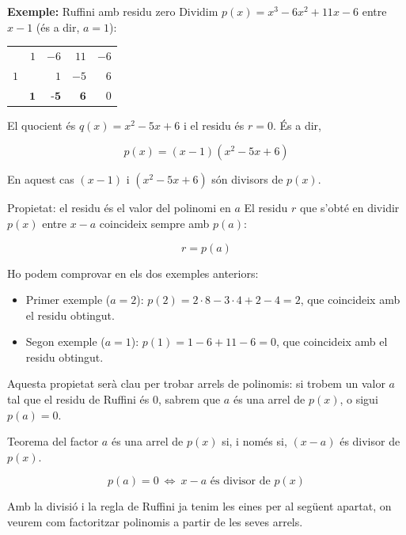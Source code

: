 \begin{exemple}{\textbf{Exemple:} Ruffini amb residu zero}
Dividim $p(x) = x^3-6x^2+11x-6$ entre $x-1$ (és a dir, $a=1$):

\begin{center}
\renewcommand{\arraystretch}{1.25}
\begin{tabular}{r|rrrr}
 & $1$ & $-6$ & $11$ & $-6$ \\
$1$ &  & $1$ & $-5$ & $6$ \\ \hline
 & $\textbf{1}$ & $\textbf{-5}$ & $\textbf{6}$ & $\boxed{0}$ \\
\end{tabular}
\end{center}

El quocient és $q(x)=x^2-5x+6$ i el residu és $r=0$. És a dir,

\[
p(x) = (x-1)(x^2-5x+6)
\]

En aquest cas $(x-1)$ i $(x^2-5x+6)$ són divisors de $p(x)$.
\end{exemple}

\begin{propietat}{Propietat: el residu és el valor del polinomi en $a$}
El residu $r$ que s'obté en dividir $p(x)$ entre $x-a$ coincideix sempre amb $p(a)$:

\[
r = p(a)
\]

Ho podem comprovar en els dos exemples anteriors:

\begin{itemize}
\item Primer exemple ($a=2$): $p(2) = 2\cdot 8-3\cdot 4+2-4 = 2$, que coincideix amb el residu obtingut.
\item Segon exemple ($a=1$): $p(1) = 1-6+11-6 = 0$, que coincideix amb el residu obtingut.
\end{itemize}

Aquesta propietat serà clau per trobar arrels de polinomis: si trobem un valor $a$ tal que el residu de Ruffini és $0$, sabrem que $a$ és una arrel de $p(x)$, o sigui $p(a)=0$.
\end{propietat}

\begin{propietat}{Teorema del factor}
$a$ és una arrel de $p(x)$ si, i només si, $(x-a)$ és divisor de $p(x)$.

\[
p(a) = 0 \ \Leftrightarrow \ x-a \text{ és divisor de } p(x)
\]
\end{propietat}

Amb la divisió i la regla de Ruffini ja tenim les eines per al següent apartat, on veurem com factoritzar polinomis a partir de les seves arrels.

